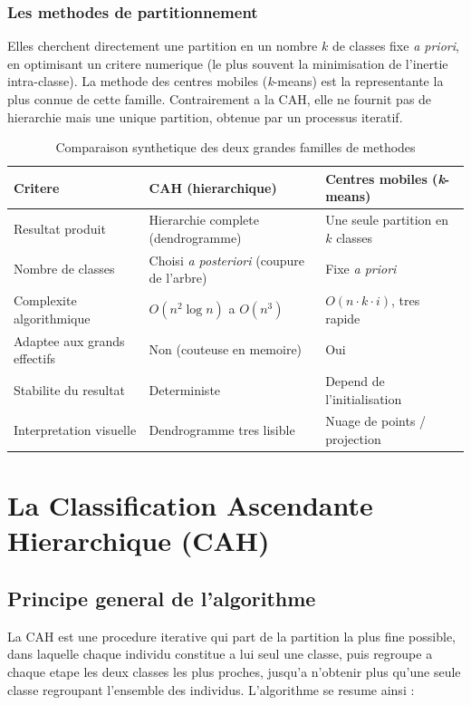 \documentclass[12pt,a4paper]{book}
\newcommand{\kmeans}{\textit{k}-means}
\begin{document}
	\subsection{Les methodes de partitionnement}
	
	Elles cherchent directement une partition en un nombre $k$ de classes fixe \textit{a priori}, en optimisant un critere numerique (le plus souvent la minimisation de l'inertie intra-classe). La methode des centres mobiles (\kmeans) est la representante la plus connue de cette famille. Contrairement a la CAH, elle ne fournit pas de hierarchie mais une unique partition, obtenue par un processus iteratif.
	
	\begin{table}[h]
		\centering
		\caption{Comparaison synthetique des deux grandes familles de methodes}
		\label{tab:comparaison}
		\begin{tabular}{p{3.5cm}p{4.5cm}p{4.5cm}}
			\toprule
			\textbf{Critere} & \textbf{CAH (hierarchique)} & \textbf{Centres mobiles (\kmeans)} \\
			\midrule
			Resultat produit & Hierarchie complete (dendrogramme) & Une seule partition en $k$ classes \\
			Nombre de classes & Choisi \textit{a posteriori} (coupure de l'arbre) & Fixe \textit{a priori} \\
			Complexite algorithmique & $O(n^2 \log n)$ a $O(n^3)$ & $O(n \cdot k \cdot i)$, tres rapide \\
			Adaptee aux grands effectifs & Non (couteuse en memoire) & Oui \\
			Stabilite du resultat & Deterministe & Depend de l'initialisation \\
			Interpretation visuelle & Dendrogramme tres lisible & Nuage de points / projection \\
			\bottomrule
		\end{tabular}
	\end{table}
	
	\chapter{La Classification Ascendante Hierarchique (CAH)}
	
	\section{Principe general de l'algorithme}
	
	La CAH est une procedure iterative qui part de la partition la plus fine possible, dans laquelle chaque individu constitue a lui seul une classe, puis regroupe a chaque etape les deux classes les plus proches, jusqu'a n'obtenir plus qu'une seule classe regroupant l'ensemble des individus. L'algorithme se resume ainsi :
	
\end{document}

